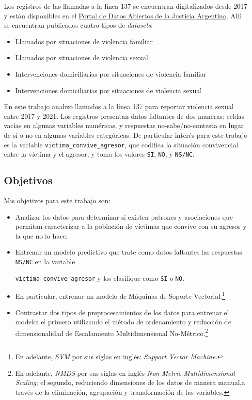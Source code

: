 \documentclass[10 pt]{article}
\begin{document}
Los registros de las llamadas a la línea 137 se encuentran digitalizados desde 2017 y están disponibles en el \href{http://datos.jus.gob.ar/}{Portal de Datos Abiertos de la Justicia Argentina}. Allí se encuentran publicados cuatro tipos de \textit{datasets}: 

\begin{itemize}
    \item Llamados por situaciones de violencia familiar
    \item Llamados por situaciones de violencia sexual
    \item Intervenciones domiciliarias por situaciones de violencia familiar
    \item Intervenciones domiciliarias por situaciones de violencia sexual
\end{itemize}

En este trabajo analizo llamados a la línea 137 para reportar violencia sexual entre 2017 y 2021. Los registros  presentan datos faltantes de dos maneras: celdas vacías en algunas variables numéricas, y respuestas no-sabe/no-contesta en lugar de sí o no en algunas variables categóricas. De particular interés para este trabajo es la variable \texttt{victima\_convive\_agresor}, que codifica la situación convivencial entre la víctima y el agresor, y toma los valores \texttt{SI}, \texttt{NO}, y \texttt{NS/NC}.

\subsection{Objetivos}

Mis objetivos para este trabajo son:

\begin{itemize}
    \item Analizar los datos para determinar si existen patrones y asociaciones que permitan caracterizar a la población de víctimas que convive con su agresor y la que no lo hace.
    \item Entrenar un modelo predictivo que trate como datos faltantes las respuestas \texttt{NS/NC} en la variable 
    
    \texttt{victima\_convive\_agresor} y los clasifique como \texttt{SI} o \texttt{NO}. 
    \item En particular, entrenar un modelo de Máquinas de Soporte Vectorial.\footnote{En adelante, \textit{SVM} por sus siglas en inglés: \textit{Support Vector Machine}.}  
    \item Contrastar dos tipos de preprocesamientos de los datos para entrenar el modelo: el primero utilizando el método de ordenamiento y reducción de dimensionalidad de Escalamiento Multidimensional No-Métrico.\footnote{En adelante, \textit{NMDS} por sus siglas en inglés \textit{Non-Metric Multidimensional Scaling}; el segundo, reduciendo dimensiones de los datos de manera manual,a través de la eliminación, agrupación y transformación de las variables.} 

\end{itemize}
\end{document}
